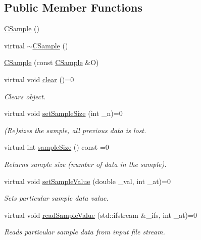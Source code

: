 \subsection*{Public Member Functions}
\begin{DoxyCompactItemize}
\item 
\hyperlink{class_c_sample_acb24169cbb8c2c32151af43c60f29e26}{C\-Sample} ()
\item 
virtual \hyperlink{class_c_sample_a9e0d665855900b996d61bd6b15926441}{$\sim$\-C\-Sample} ()
\item 
\hyperlink{class_c_sample_ac2d67f8db3ca7eeb7143bee73530c564}{C\-Sample} (const \hyperlink{class_c_sample}{C\-Sample} \&O)
\item 
virtual void \hyperlink{class_c_sample_ad7418ef7bc065cdf14213c0f393720fe}{clear} ()=0
\begin{DoxyCompactList}\small\item\em Clears object. \end{DoxyCompactList}\item 
virtual void \hyperlink{class_c_sample_ae227fc339ddebd8c2744eb6c605b4544}{set\-Sample\-Size} (int \-\_\-n)=0
\begin{DoxyCompactList}\small\item\em (Re)sizes the sample, all previous data is lost. \end{DoxyCompactList}\item 
virtual int \hyperlink{class_c_sample_a7e732f11d879108d632170cdf3fe065a}{sample\-Size} () const =0
\begin{DoxyCompactList}\small\item\em Returns sample size (number of data in the sample). \end{DoxyCompactList}\item 
virtual void \hyperlink{class_c_sample_a6817250e12af0b84730ddbbee7832ce7}{set\-Sample\-Value} (double \-\_\-val, int \-\_\-at)=0
\begin{DoxyCompactList}\small\item\em Sets particular sample data value. \end{DoxyCompactList}\item 
virtual void \hyperlink{class_c_sample_a3f2e73517f1818861a7b5114e5412e7d}{read\-Sample\-Value} (std\-::ifstream \&\-\_\-ifs, int \-\_\-at)=0
\begin{DoxyCompactList}\small\item\em Reads particular sample data from input file stream. \end{DoxyCompactList}\item 

\end{DoxyCompactItemize}
